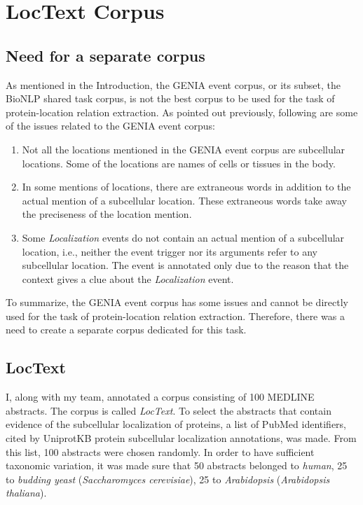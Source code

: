 \chapter{LocText Corpus}\label{chapter:corpus}

\section{Need for a separate corpus}

As mentioned in the Introduction, the GENIA event corpus, or its subset, the BioNLP shared task corpus, is not the best corpus to be used for the task of protein-location relation extraction. As pointed out previously, following are some of the issues related to the GENIA event corpus:

\begin{enumerate}

\item Not all the locations mentioned in the GENIA event corpus are subcellular locations. Some of the locations are names of cells or tissues in the body.

\item In some mentions of locations, there are extraneous words in addition to the actual mention of a subcellular location. These extraneous words take away the preciseness of the location mention. %

\item Some \textit{Localization} events do not contain an actual mention of a subcellular location, i.e., neither the event trigger nor its arguments refer to any subcellular location. The event is annotated only due to the reason that the context gives a clue about the \textit{Localization} event.

\end{enumerate}

To summarize, the GENIA event corpus has some issues and cannot be directly used for the task of protein-location relation extraction. Therefore, there was a need to create a separate corpus dedicated for this task.

\section{LocText}\label{sec:LocTextCorpus}


I, along with my team, annotated a corpus consisting of 100 MEDLINE \cite{medline} abstracts. The corpus is called \emph{LocText}. To select the abstracts that contain evidence of the subcellular localization of proteins, a list of PubMed \cite{pubmed} identifiers, cited by UniprotKB \cite{magrane2011uniprot} protein subcellular localization annotations, was made. %
From this list, 100 abstracts were chosen randomly. In order to have sufficient taxonomic variation, it was made sure that 50 abstracts belonged to \emph{human}, 25 to \emph{budding yeast} (\emph{Saccharomyces cerevisiae}), 25 to \emph{Arabidopsis} (\emph{Arabidopsis thaliana}).

